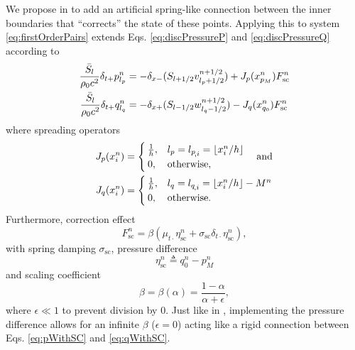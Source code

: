 We propose in \cite{Willemsen2021} to add an artificial spring-like connection between the inner boundaries that ``corrects'' the state of these points. Applying this to system \eqref{eq:firstOrderPairs} extends Eqs. \eqref{eq:discPressureP} and \eqref{eq:discPressureQ} according to
\begin{subequations}\label{eq:pressuresWithSC}
    \begin{align}
        \frac{\bar S_{l}}{\rho_0 c^2}\delta_{t+}p_{l_p}^n &= -\delta_{x-}(S_{{l}+1/2}v_{{l_p}+1/2}^{n+1/2}) + J_p(x_{p_M}^n)F_\text{sc}^n\label{eq:pWithSC}\\
        \frac{\bar S_{l}}{\rho_0 c^2}\delta_{t+}q_{l_q}^n &= -\delta_{x+}(S_{{l}-1/2}w_{{l_q}-1/2}^{n+1/2}) - J_q(x_{q_0}^n)F_\text{sc}^n\label{eq:qWithSC}
    \end{align}
\end{subequations}
where spreading operators
\begin{equation}\label{eq:spreadingOperators}
    \begin{aligned}
    J_p(x_i^n)& =
    \begin{cases}
        \frac{1}{h}, & {l_p} = {l_p}_{\!,i} = \lfloor x_i^n/h\rfloor\\
        0,& \text{otherwise},
    \end{cases}
    \quad\text{and}\\
    J_q(x_i^n) &=
    \begin{cases}
        \frac{1}{h}, & {l_q} = {l_q}_{\!,i} = \lfloor x_i^n/h \rfloor - M^n\\
        0,& \text{otherwise}.
    \end{cases}
\end{aligned}
\end{equation}
Furthermore, correction effect
\begin{equation}\label{eq:scForce}
    F_\text{sc}^n = \beta\left(\mu_{t\cdot}\eta_\text{sc}^n+\sigma_\text{sc}\delta_{t\cdot}\eta_\text{sc}^n\right),
\end{equation}
with spring damping $\sigma_\text{sc}$, pressure difference
\begin{equation}
    \eta_\text{sc}^n \triangleq q_0^n - p_M^n
\end{equation} 
and scaling coefficient
\begin{equation}\label{eq:betaDef}
    \beta = \beta(\alpha) = \frac{1-\alpha}{\alpha+\epsilon},
\end{equation}
where $\epsilon\ll 1$ to prevent division by 0. Just like in \cite{Willemsen2021}, implementing the pressure difference allows for an infinite $\beta$ ($\epsilon = 0$) acting like a rigid connection between Eqs. \eqref{eq:pWithSC} and \eqref{eq:qWithSC}.
